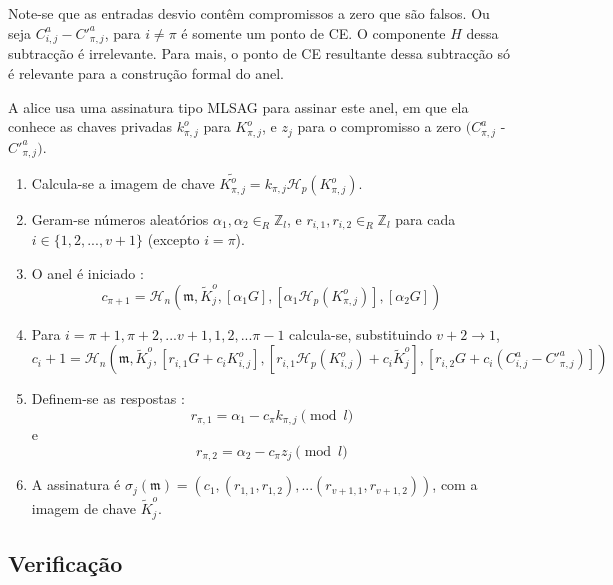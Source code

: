 Note-se que as entradas desvio contêm compromissos a zero que são falsos. Ou seja $C^a_{i, j} - C'^a_{\pi, j}$, para $i\ne\pi$ é somente um ponto de CE. O componente $H$ dessa subtracção é irrelevante. Para mais, o ponto de CE resultante dessa subtracção só é relevante para a construção formal do anel.

A alice usa uma assinatura tipo MLSAG para assinar este anel, em que ela conhece as chaves privadas $k^o_{\pi,j}$ para $K^o_{\pi,j}$, e $z_j$ para o compromisso a zero $(C^a_{\pi,j}$ - $C'^a_{\pi,j})$.

\begin{enumerate}

    \item Calcula-se a imagem de chave \(\tilde{K^o_{\pi, j}} = k_{\pi, j} \mathcal{H}_p(K^o_{\pi, j})\).

    \item Geram-se números aleatórios \(\alpha_{1},\alpha_{2} \in_R \mathbb{Z}_l\), e \(r_{i, 1},r_{i, 2} \in_R \mathbb{Z}_l\) para cada \(i \in \{1, 2, ..., v+1\}\) (excepto \(i = \pi\)).

    \item O anel é iniciado :
    \vspace{.175cm}
	\[c_{\pi+1} = \mathcal{H}_n(\mathfrak{m}, \tilde{K}^o_j, [\alpha_1 G], [\alpha_1 \mathcal{H}_p(K^o_{\pi, j})], [\alpha_2 G])\]
    \vspace{.175cm}

    \item Para \(i = \pi+1, \pi+2, ... v+1, 1, 2, ... \pi-1\) calcula-se, substituindo \(v + 2 \rightarrow 1\),\vspace{.175cm}
\[c_i+1 = \mathcal{H}_n(\mathfrak{m}, \tilde{K}^o_j, [r_{i, 1} G + c_{i} K^o_{i, j}], [r_{i, 1} \mathcal{H}_p(K^o_{i, j}) + c_{i} \tilde{K}^o_j], [r_{i, 2} G + c_{i} (C^a_{i, j} - C'^a_{\pi, j})])\]

    \item Definem-se as respostas : \[r_{\pi, 1} = \alpha_{1} - c_{\pi} k_{\pi, j} \pmod l\] e \[r_{\pi, 2} = \alpha_{2} - c_{\pi} z_j \pmod l\]

    \item A assinatura é \(\sigma_j(\mathfrak{m}) = (c_1, (r_{1, 1}, r_{1, 2}),...  (r_{v+1, 1}, r_{v+1, 2}))\), com a imagem de chave $\tilde{K}^o_j$.

\end{enumerate}

\subsection{Verificação}
\label{full-verify}

